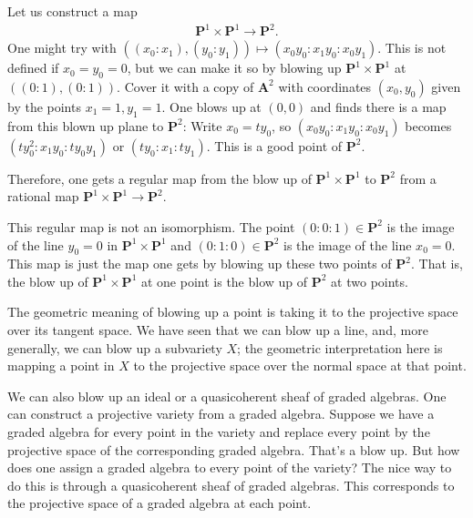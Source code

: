 \documentclass [11 pt, oneside] {article}
\begin{document}
\begin{example}[ ]\label{}\text{}
Let us construct a map 
\begin{align*}
	\mathbf{P}^1\times \mathbf{P}^1\longrightarrow \mathbf{P}^2.
\end{align*}
One might try with $((x_0:x_1),(y_0:y_1)) \longmapsto (x_0y_0:x_1y_0:x_0y_1)$. This is not defined if $x_0=y_0=0$, but we can make it so by blowing up $\mathbf{P}^1\times \mathbf{P}^1$ at $((0:1), (0:1) )$. Cover it with a copy of $\mathbf{A}^2$ with coordinates $(x_0,y_0)$ given by the points $x_1=1,y_1=1$. One blows up at $(0,0)$ and finds there is a map from this blown up plane to $\mathbf{P}^2$: Write $x_0=ty_0$, so $(x_0y_0:x_1y_0:x_0y_1)$ becomes $(ty_0^2:x_1y_0:ty_0y_1)$ or $(ty_0:x_1:ty_1)$. This is a good point of $\mathbf{P}^2$.

Therefore, one gets a regular map from the blow up of $\mathbf{P}^1\times \mathbf{P}^1$ to $\mathbf{P}^2$ from a rational map $\mathbf{P}^1\times \mathbf{P}^1\longrightarrow \mathbf{P}^2$.

\begin{remark}
	This regular map is not an isomorphism. The point $(0:0:1)\in  \mathbf{P}^2$ is the image of the line $y_0=0$ in $\mathbf{P}^1\times \mathbf{P}^1$ and $(0:1:0)\in \mathbf{P}^2$ is the image of the line $x_0=0$. This map is just the map one gets by blowing up these two points of $\mathbf{P}^2$. That is, the blow up of $\mathbf{P}^1\times \mathbf{P}^1$ at one point is the blow up of $\mathbf{P}^2$ at two points.
\end{remark}
\end{example}

The geometric meaning of blowing up a point is taking it to the projective space over its tangent space. We have seen that we can blow up a line, and, more generally, we can blow up a subvariety $X$; the geometric interpretation here is mapping a point in $X$ to the projective space over the normal space at that point. 

We can also blow up an ideal or a quasicoherent sheaf of graded algebras. One can construct a projective variety from a graded algebra. Suppose we have a graded algebra for every point in the variety and replace every point by the projective space of the corresponding graded algebra. That's a blow up. But how does one assign a graded algebra to every point of the variety? The nice way to do this is through a quasicoherent sheaf of graded algebras. This corresponds to the projective space of a graded algebra at each point.
\end{document}
